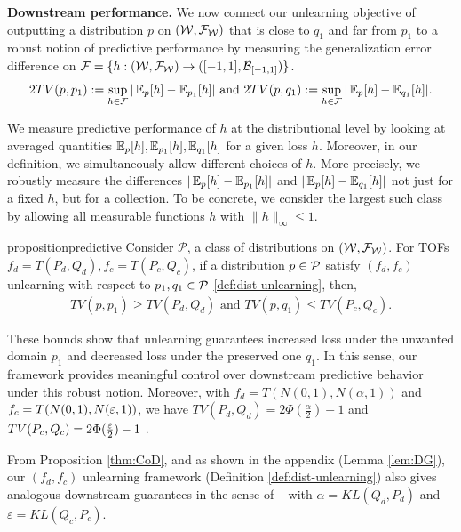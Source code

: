 \textbf{Downstream performance.}
We now connect our unlearning objective of outputting a distribution $p$ on $(\mathcal{W}, \mathcal{F}_{\mathcal{W}})$ that is close to $q_1$ and far from $p_1$ to a robust notion of predictive performance by measuring the generalization error difference on $\mathcal{F}=\{h:(\mathcal{W}, \mathcal{F}_{\mathcal{W}}) \to ([-1,1], \mathcal{B}_{[-1,1]})\}$.
\vspace{-1 mm}
\begin{equation}
2TV(p, p_1):=\sup_{h \in \cF}|\E_p[h]- \E_{p_1}[h]| \text{ and }
2TV(p, q_1):=\sup_{h \in \cF}|\E_p[h]- \E_{q_1}[h]|.
\vspace{-1 mm}
\end{equation}
\vspace{-2mm}
 \begin{remark}[Intuition]
     We measure predictive performance of $h$ at the distributional level by looking at averaged quantities $\operatorname{{\mathbb E}}_p[h], \operatorname{{\mathbb E}}_{p_1}[h],\operatorname{{\mathbb E}}_{q_1}[h]$ for a given loss $h$. Moreover, in our definition, we simultaneously allow different choices of $h$.  More precisely, we  robustly measure the differences $|\operatorname{{\mathbb E}}_p[h]- \operatorname{{\mathbb E}}_{p_1}[h]|$ and  $|\operatorname{{\mathbb E}}_p[h]- \operatorname{{\mathbb E}}_{q_1}[h]|$ not just for a fixed $h$, but for a collection. To be concrete, we consider the largest such class by allowing all measurable functions $h$ with $\|h\|_{\infty}\leq 1$.
 \end{remark}
\vspace{-2 mm}
\begin{restatable}{proposition}{predictive}
\label{prop:predictive}
Consider $\mathcal{P}$, a class of distributions on $(\mathcal{W}, \mathcal{F}_{\mathcal{W}})$. For TOFs $f_d= T(P_d, Q_d), f_c=T(P_c, Q_c)$, if a distribution $p\in \mathcal{P}$ satisfy $(f_d,f_c)$ unlearning with respect to $p_1, q_1 \in \mathcal{P}$ \ref{def:dist-unlearning}, then,
\begin{align}
TV(p,p_1) \geq TV(P_d, Q_d) \text{ and } TV(p,q_1) \leq TV(P_c,Q_c).
\end{align}
\end{restatable}
\vspace{-2 mm}
\begin{remark}[Intuition]
    These bounds show that unlearning guarantees increased loss under the unwanted domain $p_1$ and decreased loss under the preserved one $q_1$. In this sense, our framework provides meaningful control over downstream predictive behavior under this robust notion. Moreover, with $f_d=T(N(0,1), N(\alpha, 1))$ and $f_c= T(N(0,1), N(\varepsilon, 1))$, we have $TV(P_d, Q_d) = 2 \Phi(\frac{\alpha}{2}) -1$ and $TV(P_c, Q_c) = 2 \Phi(\frac{\varepsilon}{2}) -1$ \citep[Equation 7.40]{polyanskiy_wu_2025}.
\end{remark}
\vspace{-2 mm}
\begin{remark}
    From Proposition \ref{thm:CoD}, and as shown in the appendix (Lemma \ref{lem:DG}), our $(f_d,f_c)$ unlearning framework (Definition \ref{def:dist-unlearning}) also gives analogous downstream guarantees in the sense of ~\citep{allouah2025distributionalmachineunlearningselective} with $\alpha= KL(Q_d,P_d)$ and $\varepsilon=KL(Q_c,P_c)$. 
\end{remark}
\vspace{-2 mm}

